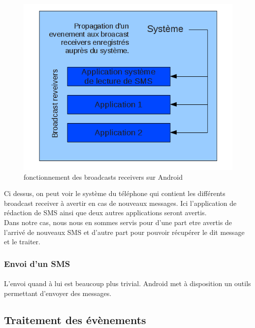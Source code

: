 \begin{figure}[!h]
	\center
	\includegraphics[width=12cm]{img/broadcast-receivers.png}
	\caption{fonctionnement des broadcasts receivers sur Android}
\end{figure}

Ci dessus, on peut voir le système du téléphone qui contient les différents broadcast receiver à avertir
en cas de nouveaux messages. Ici l'application de rédaction de SMS ainsi que deux autres applications seront
avertis.
\\
Dans notre cas, nous nous en sommes servis pour d'une part etre avertis de l'arrivé de nouveaux SMS et d'autre 
part pour pouvoir récupérer le dit message et le traiter.
\\


\subsubsection{Envoi d'un SMS}

\paragraph{}
L'envoi quand à lui est beaucoup plus trivial. Android met à disposition un outils permettant d'envoyer
des messages.



\subsection{Traitement des évènements}



